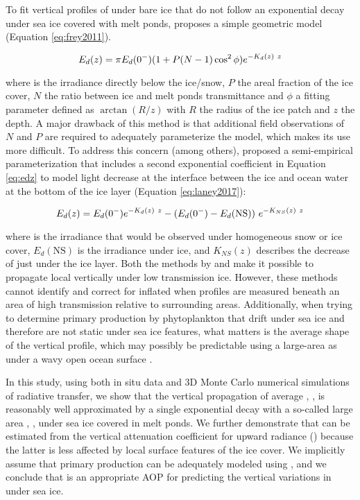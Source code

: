 To fit vertical profiles of \edz{} under bare ice that do not follow an exponential decay under sea ice covered with melt ponds, \citet{Frey2011} proposes a simple geometric model (Equation \ref{eq:frey2011}). 

\begin{equation}
    {E_d(z)}{} = \pi {E_d(0^-)}{} (1 + P(N-1)\cos^2\phi)e^{-K_{d}(z)~z}
    \label{eq:frey2011}
\end{equation}

\noindent where \edzero{} is the irradiance directly below the ice/snow, $P$ the areal fraction of the ice cover, $N$ the ratio between ice and melt ponds transmittance and $\phi$ a fitting parameter defined as $\arctan(R/z)$ with $R$ the radius of the ice patch and $z$ the depth. A major drawback of this method is that additional field observations of $N$ and $P$ are required to adequately parameterize the model, which makes its use more difficult. To address this concern (among others), \citet{Laney2017} proposed a semi-empirical parameterization that includes a second exponential coefficient in Equation \ref{eq:edz} to model light decrease at the interface between the ice and ocean water at the bottom of the ice layer (Equation \ref{eq:laney2017}):

\begin{equation}
    {E_d(z)}{} = {E_d(0^-)}{}e^{-K_{d}(z)~z} - ({E_d(0^-)}{} - E_d(\text{NS}))~e^{-K_{NS}(z)~z}
    \label{eq:laney2017}
\end{equation}

\noindent where \edzero{} is the irradiance that would be observed under homogeneous snow or ice cover, $E_d(\text{NS})$ is the irradiance under ice, and $K_{NS}(z)$ describes the decrease of \edzero{} just under the ice layer. Both the methods by \citet{Frey2011} and \citet{Laney2017} make it possible to propagate local \edz{} vertically under low transmission ice. However, these methods cannot identify and correct for inflated \ked{} when profiles are measured beneath an area of high transmission relative to surrounding areas. Additionally, when trying to determine primary production by phytoplankton that drift under sea ice and therefore are not static under sea ice features, what matters is the average shape of the vertical \edz{} profile, which may possibly be predictable using a large-area \meanked{} as under a wavy open ocean surface \citep{Zaneveld2001}. 

In this study, using both in situ data and 3D Monte Carlo numerical simulations of radiative transfer, we show that the vertical propagation of average \edz{}, \meanedz{}, is reasonably well approximated by a single exponential decay with a so-called large area \ked{}, \meanked{}, under sea ice covered in melt ponds. We further demonstrate that \meanked{} can be estimated from the vertical attenuation coefficient for upward radiance (\klu{}) because the latter is \DIFdelbegin {}\DIFdelend \DIFaddbegin {}\DIFaddend less affected by local surface features of the ice cover. We implicitly assume that primary production can be adequately modeled using \meanedz{}, and we conclude that \klu{} is an appropriate AOP for predicting the vertical variations in \meanedz{} under sea ice.